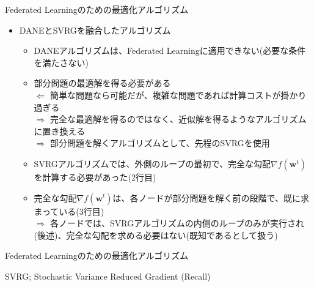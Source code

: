 \documentclass[dvipdfmx,notheorems,t]{beamer}
\begin{document}
\begin{frame}{Federated Learningのための最適化アルゴリズム}

\begin{itemize}
	\item DANEとSVRGを融合したアルゴリズム
	\begin{itemize}
		\item DANEアルゴリズムは、Federated Learningに適用できない(必要な条件を満たさない)
		\item 部分問題の最適解を得る必要がある \\
		$\Leftarrow$ 簡単な問題なら可能だが、複雑な問題であれば計算コストが掛かり過ぎる \\
		$\Rightarrow$ 完全な最適解を得るのではなく、近似解を得るようなアルゴリズムに置き換える \\
		$\Rightarrow$ 部分問題を解くアルゴリズムとして、先程の\alert{SVRG}を使用
		\newline
		
		\item SVRGアルゴリズムでは、外側のループの最初で、完全な勾配$\nabla f(\bm{w}^t)$を計算する必要があった(2行目)
		\item 完全な勾配$\nabla f(\bm{w}^t)$は、各ノードが部分問題を解く前の段階で、既に求まっている(3行目) \\
		$\Rightarrow$ 各ノードでは、SVRGアルゴリズムの内側のループのみが実行され(後述)、完全な勾配を求める必要はない(既知であるとして扱う)
	\end{itemize}
\end{itemize}

\end{frame}

\begin{frame}{Federated Learningのための最適化アルゴリズム}

\begin{algorithm}[H]
	\DontPrintSemicolon
	\caption{SVRG; Stochastic Variance Reduced Gradient (Recall) ~\cite{stochastic_2017}}
	\label{alg:svrg-recall-2}
	\begin{algorithmic}[1]
			 
				 
			\ENDFOR
		\ENDFOR
	\end{algorithmic}
\end{algorithm}

\end{frame}
\end{document}
